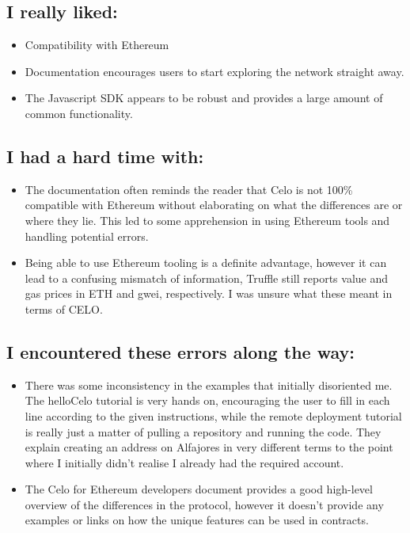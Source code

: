 \documentclass[a4paper,11pt]{article}
\begin{document}
\subsection*{I really liked:}
\begin{itemize}
\item Compatibility with Ethereum
\item Documentation encourages users to start exploring the network straight
  away.
\item The Javascript SDK appears to be robust and provides a large amount of
  common functionality.
\end{itemize}
\subsection*{I had a hard time with:}
\begin{itemize}
\item The documentation often reminds the reader that Celo is not 100\%
  compatible with Ethereum without elaborating on what the differences are or
  where they lie.  This led to some apprehension in using Ethereum tools and
  handling potential errors.
\item Being able to use Ethereum tooling is a definite advantage, however it can
  lead to a confusing mismatch of information, Truffle still reports value and
  gas prices in ETH and gwei, respectively.  I was unsure what these meant in
  terms of CELO.
\end{itemize}
\subsection*{I encountered these errors along the way:}
\begin{itemize}
\item There was some inconsistency in the examples that initially disoriented
  me.  The helloCelo tutorial is very hands on, encouraging the user to fill in
  each line according to the given instructions, while the remote deployment
  tutorial is really just a matter of pulling a repository and running the code.
  They explain creating an address on Alfajores in very different terms to the
  point where I initially didn't realise I already had the required account.
\item The Celo for Ethereum developers document provides a good high-level
  overview of the differences in the protocol, however it doesn't provide any
  examples or links on how the unique features can be used in contracts.
\end{itemize}
\end{document}
